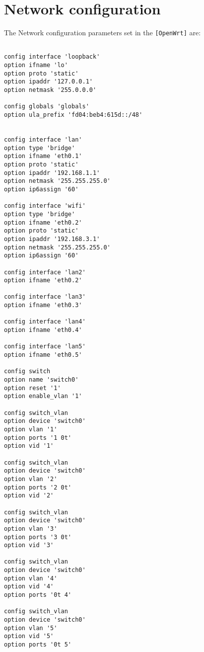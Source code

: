 \section{Network configuration}\label{app:sec:Network_config}
The Network configuration parameters set in the \verb|[OpenWrt]| are:
\begin{lstlisting}[frame=single]

config interface 'loopback'
option ifname 'lo'
option proto 'static'
option ipaddr '127.0.0.1'
option netmask '255.0.0.0'

config globals 'globals'
option ula_prefix 'fd04:beb4:615d::/48'


config interface 'lan'
option type 'bridge'
option ifname 'eth0.1'
option proto 'static'
option ipaddr '192.168.1.1'
option netmask '255.255.255.0'
option ip6assign '60'

config interface 'wifi'
option type 'bridge'
option ifname 'eth0.2'
option proto 'static'
option ipaddr '192.168.3.1'
option netmask '255.255.255.0'
option ip6assign '60'

config interface 'lan2'
option ifname 'eth0.2'

config interface 'lan3'
option ifname 'eth0.3'

config interface 'lan4'
option ifname 'eth0.4'

config interface 'lan5'
option ifname 'eth0.5'

config switch
option name 'switch0'
option reset '1'
option enable_vlan '1'

config switch_vlan
option device 'switch0'
option vlan '1'
option ports '1 0t'
option vid '1'

config switch_vlan
option device 'switch0'
option vlan '2'
option ports '2 0t'
option vid '2'

config switch_vlan
option device 'switch0'
option vlan '3'
option ports '3 0t'
option vid '3'

config switch_vlan
option device 'switch0'
option vlan '4'
option vid '4'
option ports '0t 4'

config switch_vlan
option device 'switch0'
option vlan '5'
option vid '5'
option ports '0t 5'
\end{lstlisting}
